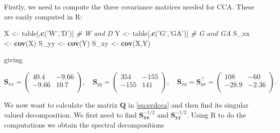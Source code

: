 \documentclass[]{book}
\newenvironment{Shaded}{\begin{snugshade}}{\end{snugshade}}
\newcommand{\CommentTok}[1]{\textcolor[rgb]{0.56,0.35,0.01}{\textit{#1}}}
\newcommand{\DecValTok}[1]{\textcolor[rgb]{0.00,0.00,0.81}{#1}}
\newcommand{\KeywordTok}[1]{\textcolor[rgb]{0.13,0.29,0.53}{\textbf{#1}}}
\newcommand{\NormalTok}[1]{#1}
\newcommand{\OperatorTok}[1]{\textcolor[rgb]{0.81,0.36,0.00}{\textbf{#1}}}
\newcommand{\StringTok}[1]{\textcolor[rgb]{0.31,0.60,0.02}{#1}}
\theoremstyle{definition}
\theoremstyle{definition}
\theoremstyle{definition}
\theoremstyle{remark}
\begin{document}
Firstly, we need to compute the three covariance matrices needed for CCA. These are easily computed in R:

\begin{Shaded}
\begin{Highlighting}[]
\NormalTok{X <-}\StringTok{ }\NormalTok{table[,}\KeywordTok{c}\NormalTok{(}\StringTok{'W'}\NormalTok{,}\StringTok{'D'}\NormalTok{)] }\CommentTok{# W and D}
\NormalTok{Y <-}\StringTok{ }\NormalTok{table[,}\KeywordTok{c}\NormalTok{(}\StringTok{'G'}\NormalTok{,}\StringTok{'GA'}\NormalTok{)] }\CommentTok{# G and GA}
\NormalTok{S_xx <-}\StringTok{ }\KeywordTok{cov}\NormalTok{(X)}
\NormalTok{S_yy <-}\StringTok{ }\KeywordTok{cov}\NormalTok{(Y)}
\NormalTok{S_xy <-}\StringTok{ }\KeywordTok{cov}\NormalTok{(X,Y)}
\end{Highlighting}
\end{Shaded}

giving

\[\mathbf S_{xx} =\begin{pmatrix}40.4&-9.66 \\-9.66&10.7 \\\end{pmatrix}, \quad \mathbf S_{yy} =\begin{pmatrix}354&-155 \\-155&141 \\\end{pmatrix}, \quad \mathbf S_{xy}=\mathbf S_{yx}^\top =\begin{pmatrix}108&-60 \\-28.9&-2.36 \\\end{pmatrix}.\]

We now want to calculate the matrix \(\mathbf Q\) in \eqref{eq:svdcca} and then find its singular valued decomposition. We first need to find \(\mathbf S_{\mathbf x\mathbf x}^{-1/2}\) and \(\mathbf S_{\mathbf y\mathbf y}^{-1/2}\). Using R to do the computations we obtain the spectral decompositions

\begin{Shaded}
\end{Shaded}
\end{document}
